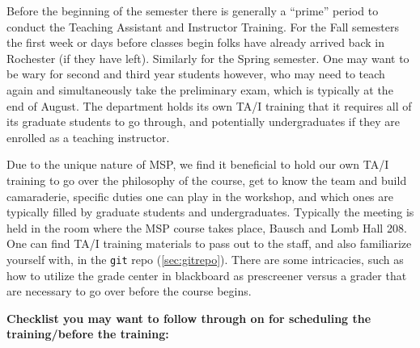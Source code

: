 \documentclass[12pt]{article}
\begin{document}
\indent Before the beginning of the semester there is generally a ``prime'' period to conduct the Teaching Assistant and Instructor Training. For the Fall semesters the first week or days before classes begin folks have already arrived back in Rochester (if they have left). Similarly for the Spring semester. One may want to be wary for second and third year students however, who may need to teach again and simultaneously take the preliminary exam, which is typically at the end of August. The department holds its own TA/I training that it requires all of its graduate students to go through, and potentially undergraduates if they are enrolled as a teaching instructor. 

\indent Due to the unique nature of MSP, we find it beneficial to hold our own TA/I training to go over the philosophy of the course, get to know the team and build camaraderie, specific duties one can play in the workshop, and which ones are typically filled by graduate students and undergraduates. Typically the meeting is held in the room where the MSP course takes place, Bausch and Lomb Hall 208. One can find TA/I training materials to pass out to the staff, and also familiarize yourself with, in the \texttt{git} repo (\ref{sec:gitrepo}). There are some intricacies, such as how to utilize the grade center in blackboard as prescreener versus a grader that are necessary to go over before the course begins.

\vspace{10pt}

\noindent \textbf{Checklist you may want to follow through on for scheduling the training/before the training:}
\end{document}
